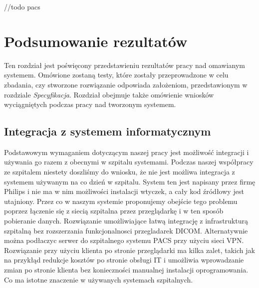 \documentclass[a4paper,11pt,twoside]{report}
\theoremstyle{definition}
\begin{document}
//todo pacs


\chapter{Podsumowanie rezultatów}
Ten rozdział jest poświęcony przedstawieniu rezultatów pracy nad omawianym systemem. Omówione zostaną testy, które zostały przeprowadzone w celu zbadania, czy stworzone rozwiązanie odpowiada założeniom, przedstawionym w rozdziale \textit{Specyfikacja}. Rozdział obejmuje także omówienie wniosków wyciągniętych podczas pracy nad tworzonym systemem. 

\section{Integracja z systemem informatycznym}
Podstawowym wymaganiem dotyczącym naszej pracy jest możliwość integracji i używania go razem z obecnymi w szpitalu systemami. Podczas naszej współpracy ze szpitalem niestety doszliśmy do wniosku, że nie jest możliwa integracja z systemem używanym na co dzień w szpitalu. System ten jest napisany przez firmę Philips i nie ma w nim możliwości instalacji wtyczek, a cały kod źródłowy jest utajniony. Przez co w naszym systemie proponujemy obejście tego problemu poprzez łączenie się z siecią szpitalna przez przeglądarkę i w ten sposób pobieranie danych. Rozwiązanie umożliwiające łatwą integrację z infrastrukturą szpitalną bez rozszerzania funkcjonalnosci przegladarek DICOM. Alternatywnie można podłaczyc serwer do szpitalnego systemu PACS przy użyciu sieci VPN. 
Rozwiązanie przy użyciu klienta po stronie przeglądarki ma kilka zalet, takich jak na przykłąd redukcje kosztów po stronie obsługi IT i umożliwia wprowadzanie zmian po stronie klienta bez konieczności manualnej instalacji oprogramowania. Co ma istotne znaczenie w używanych systemach szpitalnych.
\end{document}
